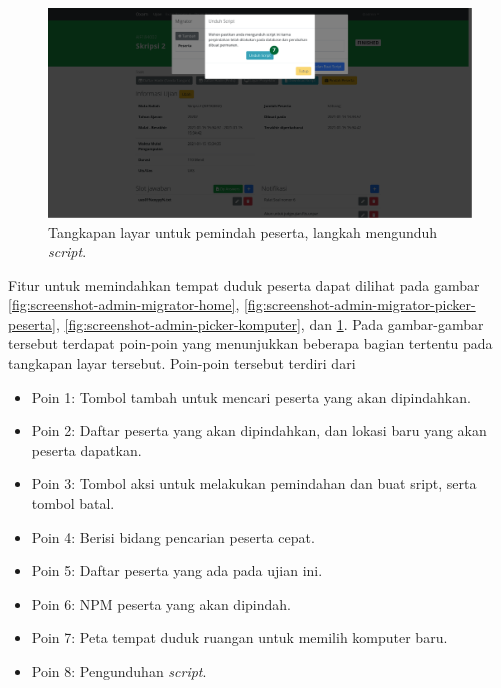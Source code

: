     \begin{figure}
        \centering
        \includegraphics[width=0.7\paperwidth]{Gambar/implemented-interface/admin/migrator-download.png}
        \caption{Tangkapan layar untuk pemindah peserta, langkah mengunduh \textit{script}.}
        \label{fig:screenshot-admin-picker-download}
    \end{figure}
    Fitur untuk memindahkan tempat duduk peserta dapat dilihat pada gambar \ref{fig:screenshot-admin-migrator-home},
    \ref{fig:screenshot-admin-migrator-picker-peserta}, \ref{fig:screenshot-admin-picker-komputer}, dan 
    \ref{fig:screenshot-admin-picker-download}.
    Pada gambar-gambar tersebut terdapat poin-poin yang menunjukkan beberapa bagian tertentu pada tangkapan layar tersebut.
    Poin-poin tersebut terdiri dari
    \begin{itemize}
        \item Poin 1: Tombol tambah untuk mencari peserta yang akan dipindahkan.
        \item Poin 2: Daftar peserta yang akan dipindahkan, dan lokasi baru yang akan peserta dapatkan.
        \item Poin 3: Tombol aksi untuk melakukan pemindahan dan buat sript, serta tombol batal.
        \item Poin 4: Berisi bidang pencarian peserta cepat.
        \item Poin 5: Daftar peserta yang ada pada ujian ini.
        \item Poin 6: NPM peserta yang akan dipindah.
        \item Poin 7: Peta tempat duduk ruangan untuk memilih komputer baru.
        \item Poin 8: Pengunduhan \textit{script}.
    \end{itemize}
    
